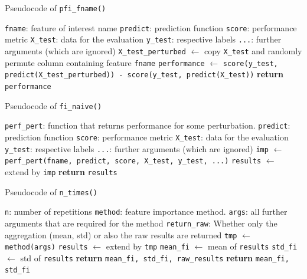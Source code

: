 {\begin{enumerate}[a)]
		Pseudocode of \texttt{pfi\_fname()}
		
		\begin{algorithm}[H]
			\caption{\texttt{pfi\_fname()}}
			\begin{algorithmic}[1]
				\Require \texttt{fname}: feature of interest name
				\Require \texttt{predict}: prediction function
				\Require \texttt{score}: performance metric
				\Require \texttt{X\_test}: data for the evaluation
				\Require \texttt{y\_test}: respective labels
				\Require \texttt{...}: further arguments (which are ignored)
				\State \texttt{X\_test\_perturbed} $\gets$ copy \texttt{X\_test} and randomly permute column containing feature \texttt{fname}
				\State \texttt{performance} $\gets$ \texttt{score(y\_test, predict(X\_test\_perturbed)) - score(y\_test, predict(X\_test))}
				\State \textbf{return} \texttt{performance}
			\end{algorithmic}
		\end{algorithm}
		
		Pseudocode of \texttt{fi\_naive()}
		
		\begin{algorithm}[H]
			\caption{\texttt{fi\_naive()}}
			\begin{algorithmic}[1]
				\Require \texttt{perf\_pert}: function that returns performance for some perturbation.
				\Require \texttt{predict}: prediction function
				\Require \texttt{score}: performance metric
				\Require \texttt{X\_test}: data for the evaluation
				\Require \texttt{y\_test}: respective labels
				\Require \texttt{...}: further arguments (which are ignored)
				\State \texttt{imp} $\gets$ \texttt{perf\_pert(fname, predict, score, X\_test, y\_test, ...)}
				\State \texttt{results} $\gets$ extend by \texttt{imp}
				\EndFor
				\State \textbf{return} \texttt{results}
			\end{algorithmic}
		\end{algorithm}
		
		Pseudocode of \texttt{n\_times()}
		
		\begin{algorithm}[H]
			\caption{\texttt{n\_times()}}
			\begin{algorithmic}[1]
				\Require \texttt{n}: number of repetitions
				\Require \texttt{method}: feature importance method.
				\Require \texttt{args}: all further arguments that are required for the method
				\Require \texttt{return\_raw}: Whether only the aggregation (mean, std) or also the raw results are returned
				\State \texttt{tmp} $\gets$ \texttt{method(args)}
				\State \texttt{results} $\gets$ extend by \texttt{tmp}
				\EndFor
				\State \texttt{mean\_fi} $\gets$ mean of \texttt{results}
				\State \texttt{std\_fi} $\gets$ std of \texttt{results}
				 \textbf{return} \texttt{mean\_fi, std\_fi, raw\_results}
				 \textbf{return} \texttt{mean\_fi, std\_fi}
				\EndIf
			\end{algorithmic}
		\end{algorithm}
		

\end{enumerate}}
